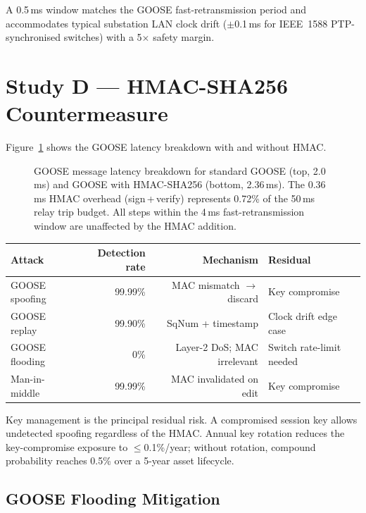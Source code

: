 \documentclass[11pt,a4paper]{article}
\begin{document}
\medskip\noindent
A 0.5\,ms window matches the GOOSE fast-retransmission period and
accommodates typical substation LAN clock drift ($\pm$0.1\,ms for
IEEE~1588 PTP-synchronised switches) with a 5$\times$ safety margin.

\section{Study D --- HMAC-SHA256 Countermeasure}
\label{sec:studyD}

Figure~\ref{fig:hmac} shows the GOOSE latency breakdown with and without
HMAC.

\begin{figure}[htbp]
  \centering
  \resizebox{0.96\textwidth}{!}{}
  \caption{GOOSE message latency breakdown for standard GOOSE (top,
           2.0\,ms) and GOOSE with HMAC-SHA256 (bottom, 2.36\,ms).
           The 0.36\,ms HMAC overhead (sign\,+\,verify) represents
           0.72\% of the 50\,ms relay trip budget.  All steps within
           the 4\,ms fast-retransmission window are unaffected by the
           HMAC addition.}
  \label{fig:hmac}
\end{figure}

\begin{center}
\begin{tabular}{@{}lrrl@{}}
\toprule
Attack & Detection rate & Mechanism & Residual \\
\midrule
GOOSE spoofing & 99.99\% & MAC mismatch $\to$ discard & Key compromise \\
GOOSE replay & 99.90\% & SqNum + timestamp & Clock drift edge case \\
GOOSE flooding & 0\% & Layer-2 DoS; MAC irrelevant & Switch rate-limit needed \\
Man-in-middle & 99.99\% & MAC invalidated on edit & Key compromise \\
\bottomrule
\end{tabular}
\end{center}

\medskip\noindent
Key management is the principal residual risk.  A compromised session key
allows undetected spoofing regardless of the HMAC.  Annual key rotation
reduces the key-compromise exposure to $\leq$0.1\%/year; without
rotation, compound probability reaches 0.5\% over a 5-year asset
lifecycle.

\subsection*{GOOSE Flooding Mitigation}
\end{document}
